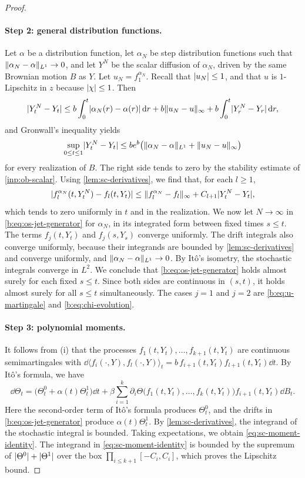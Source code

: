 \begin{proof}
\paragraph{Step 2: general distribution functions.}
Let $\alpha$ be a distribution function, let $\alpha_N$ be step distribution
functions such that $\lVert \alpha_N-\alpha\rVert_{L^1}\to0$, and let $Y^N$ be the
scalar diffusion of $\alpha_N$, driven by the same Brownian motion $B$ as
$Y$. Let $u_N=f_1^{\alpha_N}$. Recall that $\lvert u_N\rvert\le1$, and that $u$ is
$1$-Lipschitz in $z$ because $\lvert \chi\rvert\le1$. Then
\[
 \lvert Y^N_t-Y_t\rvert\le b\int_0^t\lvert \alpha_N(r)-\alpha(r)\rvert\,\mathrm d r
   +b\lVert u_N-u\rVert_\infty+b\int_0^t\lvert Y^N_r-Y_r\rvert\,\mathrm d r ,
\]
and Gronwall's inequality yields
\[
 \sup_{0\le t\le1}\lvert Y^N_t-Y_t\rvert
 \le be^b\bigl(\lVert \alpha_N-\alpha\rVert_{L^1}+\lVert u_N-u\rVert_\infty\bigr)
\]
for every realization of $B$. The right side tends to zero by the stability
estimate of \cref{inp:ob-scalar}. Using \cref{lem:sc-derivatives}, we find
that, for each $l\ge1$,
\[
 \lvert f_l^{\alpha_N}(t,Y^N_t)-f_l(t,Y_t)\rvert
 \le\lVert f_l^{\alpha_N}-f_l\rVert_\infty+C_{l+1}\lvert Y^N_t-Y_t\rvert,
\]
which tends to zero uniformly in $t$ and in the realization. We now let
$N\to\infty$ in \eqref{b:eq:os-jet-generator} for $\alpha_N$, in its
integrated form between fixed times $s\le t$. The terms $f_j(t,Y_t)$ and
$f_j(s,Y_s)$ converge uniformly. The drift integrals also converge
uniformly, because their integrands are bounded by
\cref{lem:sc-derivatives} and converge uniformly, and
$\lVert \alpha_N-\alpha\rVert_{L^1}\to0$. By It\^o's isometry, the stochastic
integrals converge in $L^2$. We conclude that \eqref{b:eq:os-jet-generator}
holds almost surely for each fixed $s\le t$. Since both sides are continuous
in $(s,t)$, it holds almost surely for all $s\le t$ simultaneously. The cases
$j=1$ and $j=2$ are \eqref{b:eq:u-martingale} and
\eqref{b:eq:chi-evolution}.

\paragraph{Step 3: polynomial moments.}
It follows from (i) that the processes $f_1(t,Y_t),\dots,f_{k+1}(t,Y_t)$ are
continuous semimartingales with
$\dd\langle f_i(\cdot,Y),f_l(\cdot,Y)\rangle_t
 =b\,f_{i+1}(t,Y_t)f_{l+1}(t,Y_t)\dd t$. By It\^o's formula, we have
\[
 \dd\Theta_t=\bigl(\Theta^0_t+\alpha(t)\Theta^1_t\bigr)\dd t
   +\beta\sum_{i=1}^k\partial_i\Theta\bigl(f_1(t,Y_t),\dots,f_k(t,Y_t)\bigr)
     f_{i+1}(t,Y_t)\dd B_t.
\]
Here the second-order term of It\^o's formula produces $\Theta^0_t$, and the
drifts in \eqref{b:eq:os-jet-generator} produce $\alpha(t)\Theta^1_t$. By
\cref{lem:sc-derivatives}, the integrand of the stochastic integral is
bounded. Taking expectations, we obtain \eqref{eq:sc-moment-identity}. The
integrand in \eqref{eq:sc-moment-identity} is bounded by the supremum of
$\lvert \Theta^0\rvert+\lvert \Theta^1\rvert$ over the box $\prod_{i\le k+1}[-C_i,C_i]$,
which proves the Lipschitz bound.


\end{proof}
